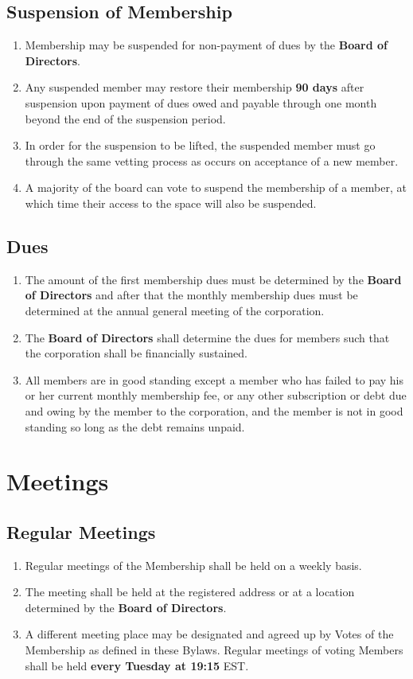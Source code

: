 \documentclass{article}
\begin{document}
\subsection{Suspension of Membership}
\begin{enumerate}
    \item Membership may be suspended for non-payment of dues by the \textbf{Board of Directors}.
    \item Any suspended member may restore their membership \textbf{90 days} after suspension upon payment of dues owed and payable through one month beyond the end of the suspension period.
    \item In order for the suspension to be lifted, the suspended member must go through the same vetting process as occurs on acceptance of a new member.
    \item A majority of the board can vote to suspend the membership of a member, at which time their access to the space will also be suspended.
\end{enumerate}
\subsection{Dues}
\begin{enumerate}
    \item The amount of the first membership dues must be determined by the \textbf{Board of Directors} and after that the monthly membership dues must be determined at the annual general meeting of the corporation.
    \item The \textbf{Board of Directors} shall determine the dues for members such that the corporation shall be financially sustained.
    \item All members are in good standing except a member who has failed to pay his or her current monthly membership fee, or any other subscription or debt due and owing by the member to the corporation, and the member is not in good standing so long as the debt remains unpaid.
\end{enumerate}

\section{Meetings}
\subsection{Regular Meetings}
\begin{enumerate}
    \item Regular meetings of the Membership shall be held on a weekly basis.
    \item The meeting shall be held at the registered address or at a location determined by the \textbf{Board of Directors}.
    \item A different meeting place may be designated and agreed up by Votes of the Membership as defined in these Bylaws. Regular meetings of voting Members shall be held \textbf{every Tuesday at 19:15} EST.
\end{enumerate}
\end{document}
